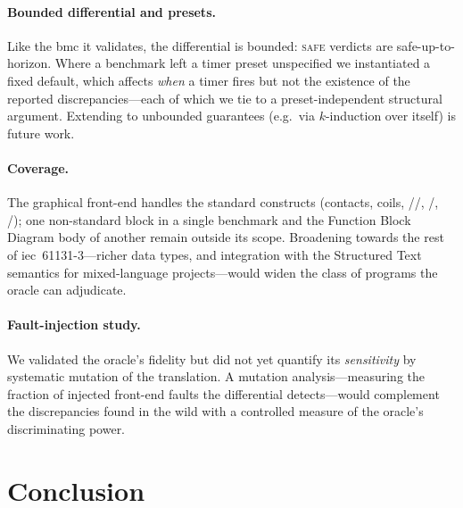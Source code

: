 \paragraph{Bounded differential and presets.} Like the \gls{bmc} it validates, the
differential is bounded: \textsc{safe} verdicts are safe-up-to-horizon. Where a
benchmark left a timer preset unspecified we instantiated a fixed default, which
affects \emph{when} a timer fires but not the existence of the reported
discrepancies---each of which we tie to a preset-independent structural argument.
Extending to unbounded guarantees (e.g.\ via $k$-induction over \kld{} itself) is
future work.

\paragraph{Coverage.} The graphical front-end handles the standard constructs
(contacts, coils, //, /,
/); one non-standard block in a single benchmark and the
Function Block Diagram body of another remain outside its scope. Broadening \kld{}
towards the rest of \gls{iec}~61131-3---richer data types, and integration with the
\kst{} Structured Text semantics for mixed-language projects---would widen the class
of programs the oracle can adjudicate.

\paragraph{Fault-injection study.} We validated the oracle's fidelity but did not
yet quantify its \emph{sensitivity} by systematic mutation of the translation. A
mutation analysis---measuring the fraction of injected front-end faults the
differential detects---would complement the discrepancies found in the wild with a
controlled measure of the oracle's discriminating power.

\section{Conclusion}
\label{sec:conclusion}

